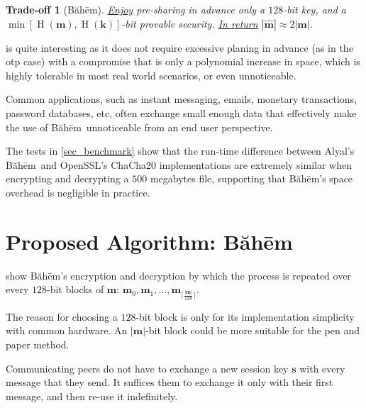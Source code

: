 \documentclass[twocolumn,hidelinks]{article}
\newcommand{\baheem}{Băhēm}
\newcommand{\alyal}{Alyal}
\DeclareMathOperator{\entropy}{H}
\newtheorem{tradeoff}{Trade-off}
\begin{document}
\begin{tradeoff}[\baheem]
    \emph{\underline{Enjoy}} pre-sharing in advance only a $128$-bit key,
    and a $\min[\entropy(\mathbf{m}), \entropy(\mathbf{k})]$-bit provable
    security.
    \emph{\underline{In return}} $|\mathbf{\hat m}| \approx 2|\mathbf{m}|$.
    \label{tradeoff_baheem}
\end{tradeoff}

 is quite interesting as it does not require
excessive planing in advance (as in the \gls{otp} case) with a compromise
that is only a polynomial increase in space, which is highly tolerable in
most real world scenarios, or even unnoticeable.

Common applications, such as instant messaging, emails, monetary
transactions, password databases, etc, often exchange small enough data
that effectively make the use of \baheem\ unnoticeable from an end user
perspective.

The tests in \cref{sec_benchmark} show that the run-time difference between
\alyal's \baheem\ and OpenSSL's ChaCha20 implementations are extremely
similar when encrypting and decrypting a $500$ megabytes file, supporting
that \baheem's space overhead is negligible in practice.


\section{Proposed Algorithm: \baheem}
 show \baheem's encryption and decryption by which
the process is repeated over every $128$-bit blocks of $\mathbf{m}$:
$\mathbf{m}_0, \mathbf{m}_1, \ldots,
\mathbf{m}_{\lceil\frac{|\mathbf{m}|}{128}\rceil}$.

The reason for choosing a $128$-bit block is only for its implementation
simplicity with common hardware.  An $|\mathbf{m}|$-bit block could be more
suitable for the pen and paper method.

Communicating peers do not have to exchange a new session key $\mathbf{s}$
with every message that they send.  It suffices them to exchange it only
with their first message, and then re-use it indefinitely.
\end{document}

